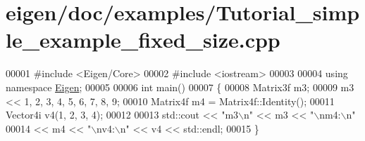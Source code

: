 \hypertarget{eigen_2doc_2examples_2_tutorial__simple__example__fixed__size_8cpp_source}{}\section{eigen/doc/examples/\+Tutorial\+\_\+simple\+\_\+example\+\_\+fixed\+\_\+size.cpp}
\label{eigen_2doc_2examples_2_tutorial__simple__example__fixed__size_8cpp_source}

\begin{DoxyCode}
00001 \textcolor{preprocessor}{#include <Eigen/Core>}
00002 \textcolor{preprocessor}{#include <iostream>}
00003 
00004 \textcolor{keyword}{using namespace }\hyperlink{namespace_eigen}{Eigen};
00005 
00006 \textcolor{keywordtype}{int} main()
00007 \{
00008   Matrix3f m3;
00009   m3 << 1, 2, 3, 4, 5, 6, 7, 8, 9;
00010   Matrix4f m4 = Matrix4f::Identity();
00011   Vector4i v4(1, 2, 3, 4);
00012 
00013   std::cout << \textcolor{stringliteral}{"m3\(\backslash\)n"} << m3 << \textcolor{stringliteral}{"\(\backslash\)nm4:\(\backslash\)n"}
00014     << m4 << \textcolor{stringliteral}{"\(\backslash\)nv4:\(\backslash\)n"} << v4 << std::endl;
00015 \}
\end{DoxyCode}
